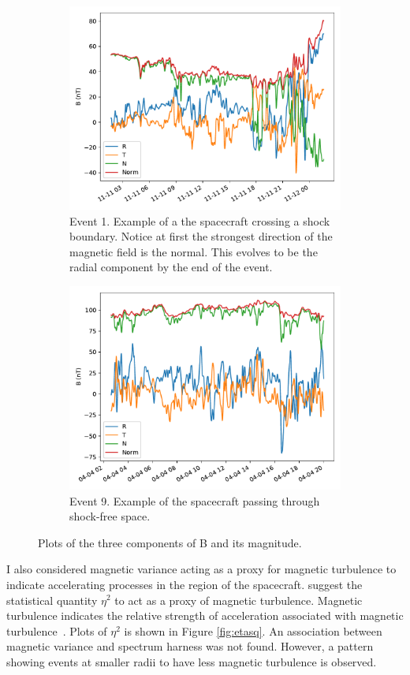 \documentclass[letterpaper,11pt]{article}
\begin{document}
\begin{figure}[htbp]
\centering
\begin{subfigure}{1.\linewidth}
\centering
\includegraphics[width=0.75\linewidth]{figures/B_RTN_01.pdf}
\caption{Event 1. Example of a the spacecraft crossing a shock boundary.  Notice at first the strongest direction of the magnetic field is the normal.  This evolves to be the radial component by the end of the event.}
\label{fig:b_rtn_01}
\end{subfigure}
\begin{subfigure}{1.\linewidth}
\centering
\includegraphics[width=0.75\linewidth]{figures/B_RTN_09.pdf}
\caption{Event 9.  Example of the spacecraft passing through shock-free space.}
\label{fig:b_rtn_09}
\end{subfigure}
\caption{Plots of the three components of B and its magnitude.}
\label{fig:b_rtn}
\end{figure}

I also considered magnetic variance acting as a proxy for magnetic turbulence to indicate accelerating processes in the region of the spacecraft.  \citet{Schwadron1996} suggest the statistical quantity $\eta^2$ to act as a proxy of magnetic turbulence.  Magnetic turbulence indicates the relative strength of acceleration associated with magnetic turbulence~\citep{Fisk2006}.  Plots of $\eta^2$ is shown in Figure \ref{fig:etasq}.  An association between magnetic variance and spectrum harness was not found.  However, a pattern showing events at smaller radii to have less magnetic turbulence is observed.
\end{document}
